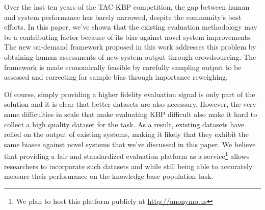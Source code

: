 Over the last ten years of the TAC-KBP competition, the gap between human and system performance has barely narrowed, despite the community's best efforts.
In this paper, we've shown that the existing evaluation methodology may be a contributing factor because of its bias against novel system improvements.
The new on-demand framework proposed in this work addresses this problem by obtaining human assessments of new system output through crowdsourcing.
The framework is made economically feasible by carefully sampling output to be assessed and correcting for sample bias through importance reweighing.

Of course, simply providing a higher fidelity evaluation signal is only part of the solution and it is clear that better datasets are also necessary.
However, the very same difficulties in scale that make evaluating KBP difficult also make it hard to collect a high quality dataset for the task.
As a result, existing datasets \citep{angeli2014combining,adel2016comparing} have relied on the output of existing systems, making it likely that they exhibit the same biases against novel systems that we've discussed in this paper.
We believe that providing a fair and standardized evaluation platform as a service\footnote{We plan to host this platform publicly at \url{http://anonymo.us}} 
allows researchers to incorporate such datasets and while still being able to accurately measure their performance on the knowledge base population task.

